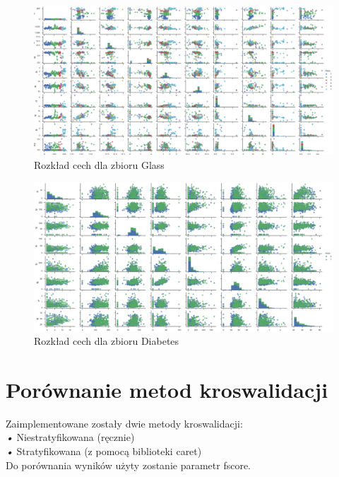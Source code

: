 \documentclass[12pt,a4paper]{article}
\begin{document}
\begin{figure}[H]
\centering
\includegraphics[width=1\textwidth]{dsGlassCombined.png}
\caption{Rozkład cech dla zbioru Glass}
\end{figure}

\begin{figure}[H]
\centering
\includegraphics[width=1\textwidth]{dsDiabetesCombined.png}
\caption{Rozkład cech dla zbioru Diabetes}
\end{figure}

\section{Porównanie metod kroswalidacji}
Zaimplementowane zostały dwie metody kroswalidacji:
\\
\textsl{•} Niestratyfikowana (ręcznie)
\\
\textsl{•} Stratyfikowana (z pomocą biblioteki caret)
\\
Do porównania wyników użyty zostanie parametr fscore.
\end{document}
